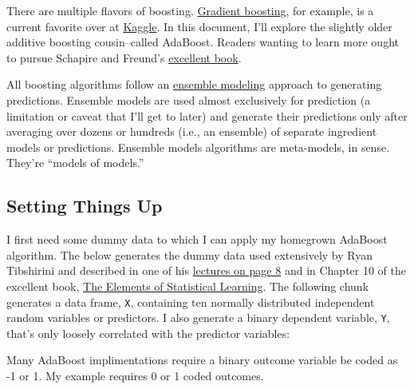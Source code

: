 \documentclass[]{tufte-handout}
\begin{document}
There are multiple flavors of boosting.
\href{http://blog.kaggle.com/2017/01/23/a-kaggle-master-explains-gradient-boosting/}{Gradient
boosting}, for example, is a current favorite over at
\href{https://www.kaggle.com/competitions}{Kaggle}. In this document,
I'll explore the slightly older additive boosting cousin--called
AdaBoost. Readers wanting to learn more ought to pursue Schapire and
Freund's
\href{https://www.amazon.com/Boosting-Foundations-Algorithms-Adaptive-Computation/dp/0262526034}{excellent
book}.

All boosting algorithms follow an
\href{https://en.wikipedia.org/wiki/Ensemble_learning}{ensemble
modeling} approach to generating predictions. Ensemble models are used
almost exclusively for prediction (a limitation or caveat that I'll get
to later) and generate their predictions only after averaging over
dozens or hundreds (i.e., an ensemble) of separate ingredient models or
predictions. Ensemble models algorithms are meta-models, in sense.
They're ``models of models.''

\subsection{Setting Things Up}\label{setting-things-up}

I first need some dummy data to which I can apply my homegrown AdaBoost
algorithm. The below generates the dummy data used extensively by Ryan
Tibshirini and described in one of his
\href{http://www.stat.cmu.edu/~ryantibs/datamining/lectures/25-boost.pdf}{lectures
on page 8} and in Chapter 10 of the excellent book,
\href{https://www.amazon.com/Elements-Statistical-Learning-Prediction-Statistics/dp/0387848576}{The
Elements of Statistical Learning}. The following chunk generates a data
frame, \texttt{X}, containing ten normally distributed independent
random variables or predictors. I also generate a binary dependent
variable, \texttt{Y}, that's only loosely correlated with the predictor
variables:

\begin{marginfigure}
Many AdaBoost implimentations require a binary outcome variable be coded
as -1 or 1. My example requires 0 or 1 coded outcomes.
\end{marginfigure}
\end{document}

